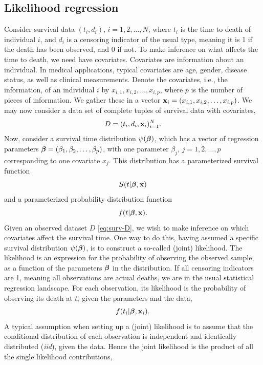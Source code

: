 \subsection{Likelihood regression}
Consider survival data $(t_i,d_i),\,i=1,2,\ldots,N$, where $t_i$ is the time to death of individual $i$, and $d_i$ is a censoring indicator of the usual type, meaning it is 1 if the death has been observed, and 0 if not. To make inference on what affects the time to death, we need have covariates. Covariates are information about an individual. In medical applications, typical covariates are age, gender, disease status, as well as clinical measurements. Denote the covariates, i.e., the information, of an individual $i$ by $x_{i,1},x_{i,2},\ldots,x_{i,p}$, where $p$ is the number of pieces of information. We gather these in a vector $\mathbf{x}_i=(x_{i,1},x_{i,2},\ldots,x_{i,p})$. We may now consider a data set of complete tuples of survival data with covariates,
\begin{equation}\label{eq:surv-D}
    D=(t_i,d_i,\mathbf{x}_i)_{i=1}^N.
\end{equation}
Now, consider a survival time distribution $\psi(\boldsymbol{\beta})$, which has a vector of regression parameters $\boldsymbol{\beta}=(\beta_1,\beta_2,\ldots,\beta_p)$, with one parameter $\beta_j,\,j=1,2,\ldots,p$ corresponding to one covariate $x_j$. This distribution has a parameterized survival function
\begin{equation*}
    S(t|\boldsymbol{\beta},\mathbf{x})
\end{equation*}
and a parameterized probability distribution function
\begin{equation*}
    f(t|\boldsymbol{\beta},\mathbf{x}).
\end{equation*}
Given an observed dataset $D$ \eqref{eq:surv-D}, we wish to make inference on which covariates affect the survival time. One way to do this, having assumed a specific survival distribution $\psi(\boldsymbol{\beta})$, is to construct a so-called (joint) likelihood.
The likelihood is an expression for the probability of observing the observed sample, as a function of the parameters $\boldsymbol{\beta}$ in the distribution. If all censoring indicators are 1, meaning all observations are actual deaths,
we are in the usual statistical regression landscape. For each observation, its likelihood is the probability of observing its death at $t_i$ given the parameters and the data,
\begin{equation*}
    f(t_i|\boldsymbol{\beta},\mathbf{x}_i).
\end{equation*}
A typical assumption when setting up a (joint) likelihood is to assume that the conditional distribution of each observation is independent and identically distributed (\textit{iid}), given the data. Hence the joint likelihood is the product of all the single likelihood contributions,
